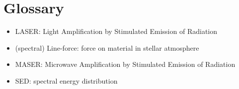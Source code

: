 \documentclass[../main/main.tex]{subfiles}
\begin{document}
\newpage
\section{Glossary}
\begin{itemize}
\item LASER: 
	\hfill Light Amplification by Stimulated Emission of Radiation

\item (spectral) Line-force: 
	\hfill force on material in stellar atmosphere

\item MASER: 
	\hfill Microwave Amplification by Stimulated Emission of Radiation


\item SED: 
	\hfill spectral energy distribution
\end{itemize}
\end{document}
